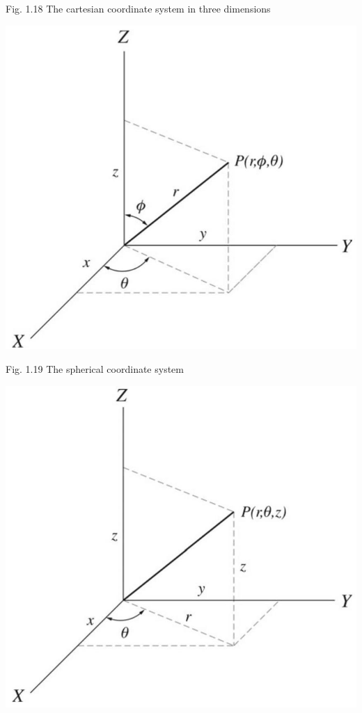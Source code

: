 \documentclass[10pt]{article}
\begin{document}
Fig. 1.18 The cartesian coordinate system in three dimensions

\begin{center}
\includegraphics[max width=\textwidth]{2024_09_13_db1f357d2aad0a03eb2eg-018(3)}
\end{center}

Fig. 1.19 The spherical coordinate system

\begin{center}
\includegraphics[max width=\textwidth]{2024_09_13_db1f357d2aad0a03eb2eg-018(1)}
\end{center}
\end{document}
